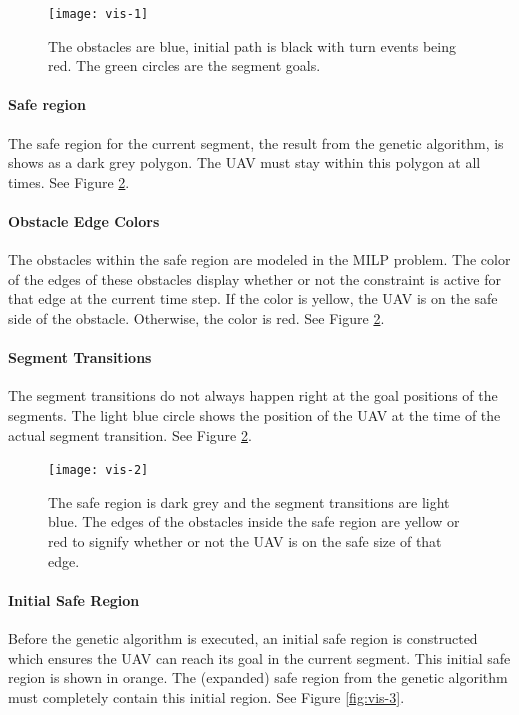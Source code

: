 \begin{figure}[h]
	\centering
    \texttt{[image: vis-1]}
    \caption[Visualization of the obstacles, initial path, turn events and segment goals]{The obstacles are blue, initial path is black with turn events being red. The green circles are the segment goals.}
    \label{fig:vis-1}     
\end{figure}

\paragraph{Safe region} The safe region for the current segment, the result from the genetic algorithm, is shows as a dark grey polygon. The UAV must stay within this polygon at all times. See Figure \ref{fig:vis-2}.
\paragraph{Obstacle Edge Colors} The obstacles within the safe region are modeled in the MILP problem. The color of the edges of these obstacles display whether or not the constraint is active for that edge at the current time step. If the color is yellow, the UAV is on the safe side of the obstacle. Otherwise, the color is red. See Figure \ref{fig:vis-2}.
\paragraph{Segment Transitions} The segment transitions do not always happen right at the goal positions of the segments. The light blue circle shows the position of the UAV at the time of the actual segment transition. See Figure \ref{fig:vis-2}.

\begin{figure}[h]
	\centering
    \texttt{[image: vis-2]}
    \caption[Visualization of the safe region, obstacle edge constrain state and the segment transitions.]{The safe region is dark grey and the segment transitions are light blue. The edges of the obstacles inside the safe region are yellow or red to signify whether or not the UAV is on the safe size of that edge.}
    \label{fig:vis-2}     
\end{figure}

\paragraph{Initial Safe Region} Before the genetic algorithm is executed, an initial safe region is constructed which ensures the UAV can reach its goal in the current segment. This initial safe region is shown in orange. The (expanded) safe region from the genetic algorithm must completely contain this initial region. See Figure \ref{fig:vis-3}.
